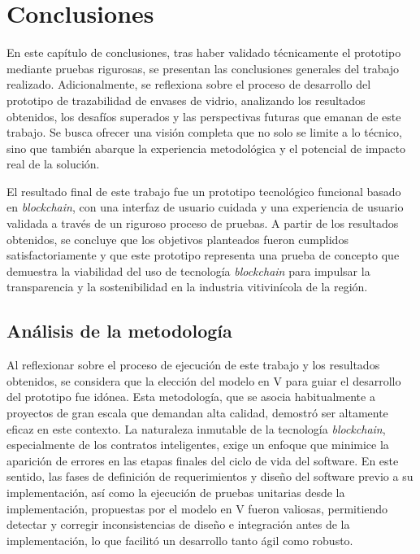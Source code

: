 \chapter[Conclusiones]{Conclusiones}
\label{cp:conclusions}

\parindent0pt

En este capítulo de conclusiones, tras haber validado técnicamente el prototipo mediante pruebas rigurosas, se presentan las conclusiones generales del trabajo realizado. Adicionalmente, se reflexiona sobre el proceso de desarrollo del prototipo de trazabilidad de envases de vidrio, analizando los resultados obtenidos, los desafíos superados y las perspectivas futuras que emanan de este trabajo. Se busca ofrecer una visión completa que no solo se limite a lo técnico, sino que también abarque la experiencia metodológica y el potencial de impacto real de la solución.

El resultado final de este trabajo fue un prototipo tecnológico funcional basado en \textit{blockchain}, con una interfaz de usuario cuidada y una experiencia de usuario validada a través de un riguroso proceso de pruebas. A partir de los resultados obtenidos, se concluye que los objetivos planteados fueron cumplidos satisfactoriamente y que este prototipo representa una prueba de concepto que demuestra la viabilidad del uso de tecnología \textit{blockchain} para impulsar la transparencia y la sostenibilidad en la industria vitivinícola de la región.

\section{Análisis de la metodología}

Al reflexionar sobre el proceso de ejecución de este trabajo y los resultados obtenidos, se considera que la elección del modelo en V para guiar el desarrollo del prototipo fue idónea. Esta metodología, que se asocia habitualmente a proyectos de gran escala que demandan alta calidad, demostró ser altamente eficaz en este contexto. La naturaleza inmutable de la tecnología \textit{blockchain}, especialmente de los contratos inteligentes, exige un enfoque que minimice la aparición de errores en las etapas finales del ciclo de vida del software. En este sentido, las fases de definición de requerimientos y diseño del software previo a su implementación, así como la ejecución de pruebas unitarias desde la implementación, propuestas por el modelo en V fueron valiosas, permitiendo detectar y corregir inconsistencias de diseño e integración antes de la implementación, lo que facilitó un desarrollo tanto ágil como robusto.

